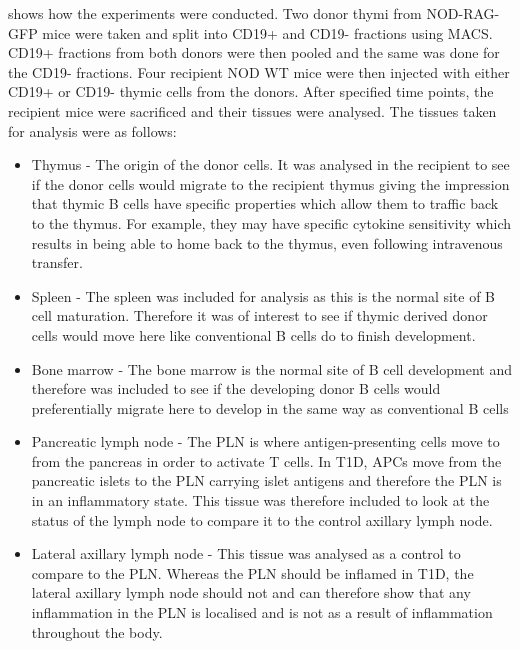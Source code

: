  shows how the experiments were conducted. 
Two donor thymi from NOD-RAG-GFP mice were taken and split into CD19+ and CD19- fractions using MACS.
CD19+ fractions from both donors were then pooled and the same was done for the CD19- fractions.
Four recipient NOD WT mice were then injected with either CD19+ or CD19- thymic cells from the donors.
After specified time points, the recipient mice were sacrificed and their tissues were analysed.
The tissues taken for analysis were as follows:
\begin{itemize}
\item Thymus - The origin of the donor cells. It was analysed in the recipient to see if the donor cells would migrate to the recipient thymus giving the impression that thymic B cells have specific properties which allow them to traffic back to the thymus.
For example, they may have specific cytokine sensitivity which results in being able to home back to the thymus, even following intravenous transfer.
\item Spleen - The spleen was included for analysis as this is the normal site of B cell maturation.
Therefore it was of interest to see if thymic derived donor cells would move here like conventional B cells do to finish development.
\item Bone marrow - The bone marrow is the normal site of B cell development and therefore was included to see if the developing donor B cells would preferentially migrate here to develop in the same way as conventional B cells
\item Pancreatic lymph node - The PLN is where antigen-presenting cells move to from the pancreas in order to activate T cells.
In T1D, APCs move from the pancreatic islets to the PLN carrying islet antigens and therefore the PLN is in an inflammatory state.
This tissue was therefore included to look at the status of the lymph node to compare it to the control axillary lymph node.
\item Lateral axillary lymph node - This tissue was analysed as a control to compare to the PLN.
Whereas the PLN should be inflamed in T1D, the lateral axillary lymph node should not and can therefore show that any inflammation in the PLN is localised and is not as a result of inflammation throughout the body.
\end{itemize}

